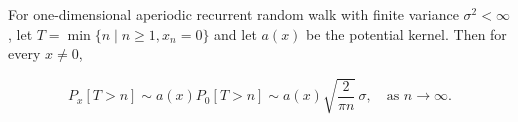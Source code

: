 For one-dimensional aperiodic recurrent random walk with finite variance $\sigma^2 < \infty$, let $T = \min\{n \mid n \geq 1, x_n = 0\}$ and let $a(x)$ be the potential kernel. Then for every $x \neq 0$,

$$P_x[T > n] \sim a(x) P_0[T > n] \sim a(x) \sqrt{\frac{2}{\pi n}} \, \sigma, \quad \text{as } n \to \infty.$$
